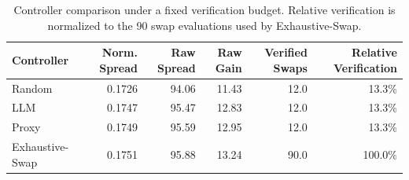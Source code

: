 \begin{table}[t]
\centering
\caption{Controller comparison under a fixed verification budget. Relative verification is normalized to the 90 swap evaluations used by Exhaustive-Swap.}
\label{tab:controller}
\small
\begin{tabular}{lrrrrr}
\toprule
Controller & Norm. Spread & Raw Spread & Raw Gain & Verified Swaps & Relative Verification \\
\midrule
Random & 0.1726 & 94.06 & 11.43 & 12.0 & 13.3\% \\
LLM & 0.1747 & 95.47 & 12.83 & 12.0 & 13.3\% \\
Proxy & 0.1749 & 95.59 & 12.95 & 12.0 & 13.3\% \\
Exhaustive-Swap & 0.1751 & 95.88 & 13.24 & 90.0 & 100.0\% \\
\bottomrule
\end{tabular}
\end{table}

